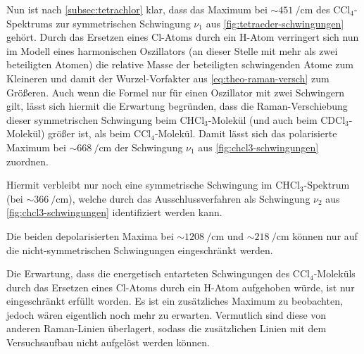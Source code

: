 \documentclass[../bericht.tex]{subfiles}
\begin{document}
        Nun ist nach \cref{subsec:tetrachlor} klar, dass das Maximum bei $\sim\SI{451}{\per\centi\meter}$ des $\mathrm{CCl_4}$-Spektrums zur symmetrischen Schwingung $\nu_1$ aus \cref{fig:tetraeder-schwingungen} gehört. Durch das Ersetzen eines Cl-Atoms durch ein H-Atom verringert sich nun im Modell eines harmonischen Oszillators (an dieser Stelle mit mehr als zwei beteiligten Atomen) die relative Masse der beteiligten schwingenden Atome zum Kleineren und damit der Wurzel-Vorfakter aus \cref{eq:theo-raman-versch} zum Größeren. Auch wenn die Formel nur für einen Oszillator mit zwei Schwingern gilt, lässt sich hiermit die Erwartung begründen, dass die Raman-Verschiebung dieser symmetrischen Schwingung beim $\mathrm{CHCl_3}$-Molekül (und auch beim $\mathrm{CDCl_3}$-Molekül) größer ist, als beim $\mathrm{CCl_4}$-Molekül. Damit lässt sich das polarisierte Maximum bei $\sim\SI{668}{\per\centi\meter}$ der Schwingung $\nu_1$ aus \cref{fig:chcl3-schwingungen} zuordnen.

        Hiermit verbleibt nur noch eine symmetrische Schwingung im $\mathrm{CHCl_3}$-Spektrum (bei $\sim\SI{366}{\per\centi\meter}$), welche durch das Ausschlussverfahren als Schwingung $\nu_2$ aus \cref{fig:chcl3-schwingungen} identifiziert werden kann.

        Die beiden depolarisierten Maxima bei $\sim\SI{1208}{\per\centi\meter}$ und $\sim\SI{218}{\per\centi\meter}$ können nur auf die nicht-symmetrischen Schwingungen eingeschränkt werden.

        Die Erwartung, dass die energetisch entarteten Schwingungen des $\mathrm{CCl_4}$-Moleküls durch das Ersetzen eines Cl-Atoms durch ein H-Atom aufgehoben würde, ist nur eingeschränkt erfüllt worden. Es ist ein zusätzliches Maximum zu beobachten, jedoch wären eigentlich noch mehr zu erwarten. Vermutlich sind diese von anderen Raman-Linien überlagert, sodass die zusätzlichen Linien mit dem Versuchsaufbau nicht aufgelöst werden können.
        \medskip
\end{document}
